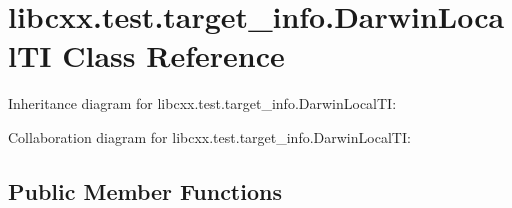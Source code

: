 \hypertarget{classlibcxx_1_1test_1_1target__info_1_1_darwin_local_t_i}{}\section{libcxx.\+test.\+target\+\_\+info.\+Darwin\+Local\+TI Class Reference}
\label{classlibcxx_1_1test_1_1target__info_1_1_darwin_local_t_i}


Inheritance diagram for libcxx.\+test.\+target\+\_\+info.\+Darwin\+Local\+TI\+:


Collaboration diagram for libcxx.\+test.\+target\+\_\+info.\+Darwin\+Local\+TI\+:
\subsection*{Public Member Functions}
